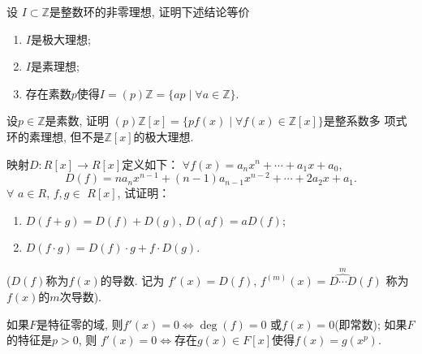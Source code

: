\begin{solution}
    
\end{solution}

\begin{problem}
    设 $I \subset \mathbb{Z}$是整数环的非零理想, 证明下述结论等价
\begin{enumerate}[(1)]
    \item $I$是极大理想;
    \item $I$是素理想;
    \item 存在素数$p$使得$I = (p)\mathbb{Z} = \{ap \mid \forall a \in \mathbb{Z}\}$.
\end{enumerate}
\end{problem}

\begin{solution}
    
\end{solution}

\begin{problem}
    设$p \in \mathbb{Z}$是素数, 证明
$(p)\mathbb{Z}[x]=\{pf(x) \mid \forall f(x) \in \mathbb{Z}[x]\}$是整系数多
项式环的素理想, 但不是$\mathbb{Z}[x]$的极大理想.
\end{problem}

\begin{solution}
    
\end{solution}

\begin{problem}
    映射$D:R[x] \longrightarrow R[x]$定义如下：
$\forall f(x) = a_nx^n + \cdots + a_1x + a_0$,
\[
    D(f) = na_nx^{n - 1} + (n - 1)a_{n - 1}x^{n - 2} + \cdots + 2a_2x + a_1.
\]
$\forall$ $a\in R$, $f, g\in$ $R[ x]$, 试证明：
\begin{enumerate}[(1)]
    \item $D(f + g) = D(f) + D(g)$, $D(af) = aD(f)$;
    \item $D(f \cdot g) = D(f) \cdot g + f \cdot D(g)$.
\end{enumerate}
($D(f)$称为$f(x)$的导数. 记为
$f'(x) = D(f),\, f^{(m)}(x) = \overset{m}{\widehat{D \cdots D}}(f)$
称为$f(x)$的$m$次导数).
\end{problem}

\begin{solution}
    
\end{solution}

\begin{problem}
    如果$F$是特征零的域, 则$f'(x) = 0 \Leftrightarrow \deg(f) = 0$
或$f(x) = 0$(即常数); 如果$F$的特征是$p > 0$, 则
$f'(x) = 0 \Leftrightarrow$存在$g(x) \in F[x]$使得$f(x) = g(x^p)$.
\end{problem}

